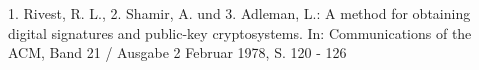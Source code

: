 \begin{thebibliography}{9}
1. Rivest, R. L., 2. Shamir, A. und 3. Adleman, L.: A method for obtaining digital signatures and public-key cryptosystems. In: Communications of the ACM, Band 21 / Ausgabe 2 Februar 1978, S. 120 - 126
\end{thebibliography}
